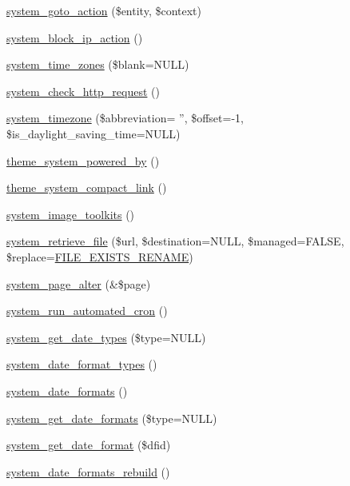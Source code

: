 \begin{DoxyCompactItemize}
\item 
\hyperlink{group__actions_gae5230dbace638d69f196392fbc77e1af}{system\_\-goto\_\-action} (\$entity, \$context)
\item 
\hyperlink{group__actions_ga02b4d9ad9eadcc1b795e2f145cc06db9}{system\_\-block\_\-ip\_\-action} ()
\item 
\hyperlink{system_8module_af21d6c134a3a6c6114def38efc153201}{system\_\-time\_\-zones} (\$blank=NULL)
\item 
\hyperlink{system_8module_ac762dd5b169e5f48a3cb96f08be8c067}{system\_\-check\_\-http\_\-request} ()
\item 
\hyperlink{system_8module_a65d003b673cc2c7fbe24dd0cad2ee15d}{system\_\-timezone} (\$abbreviation= '', \$offset=-\/1, \$is\_\-daylight\_\-saving\_\-time=NULL)
\item 
\hyperlink{group__themeable_ga706047c3b15fd20658af56eb234573e4}{theme\_\-system\_\-powered\_\-by} ()
\item 
\hyperlink{group__themeable_gab5d8809d11a9e2ee4b06c8f14f8258f3}{theme\_\-system\_\-compact\_\-link} ()
\item 
\hyperlink{system_8module_ac5de4c1bb1b8395a6a074df170cbe335}{system\_\-image\_\-toolkits} ()
\item 
\hyperlink{system_8module_a74479d43f0e63d771db29609879844b7}{system\_\-retrieve\_\-file} (\$url, \$destination=NULL, \$managed=FALSE, \$replace=\hyperlink{group__file_ga5d6636d4ccd022885823b91f17a0f464}{FILE\_\-EXISTS\_\-RENAME})
\item 
\hyperlink{system_8module_accbb83043437c6d64b3c11d32104459e}{system\_\-page\_\-alter} (\&\$page)
\item 
\hyperlink{system_8module_a1fa48b8c19dfe32cfd122c0dd5661a88}{system\_\-run\_\-automated\_\-cron} ()
\item 
\hyperlink{system_8module_a591ee79a1b5ebbcbc8b2162a74e965b2}{system\_\-get\_\-date\_\-types} (\$type=NULL)
\item 
\hyperlink{system_8module_a40f95fb822909e33c9dc245f25b7cea7}{system\_\-date\_\-format\_\-types} ()
\item 
\hyperlink{system_8module_a07720daca9cb101f5fd80ef97a3a2d85}{system\_\-date\_\-formats} ()
\item 
\hyperlink{system_8module_a5505120b882739e9648d8665e6dfd030}{system\_\-get\_\-date\_\-formats} (\$type=NULL)
\item 
\hyperlink{system_8module_ad950accb99d110fbe6bfc92b967440aa}{system\_\-get\_\-date\_\-format} (\$dfid)
\item 
\hyperlink{system_8module_a963e54c5eae58e038d83b387bda7a9b8}{system\_\-date\_\-formats\_\-rebuild} ()

\end{DoxyCompactItemize}
